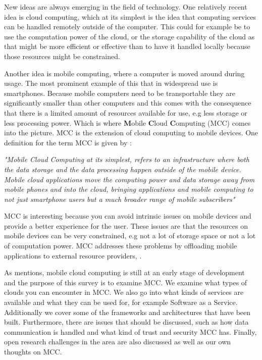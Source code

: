New ideas are always emerging in the field of technology.
One relatively recent idea is cloud computing, which at its simplest is the idea that computing services can be handled remotely outside of the computer. 
This could for example be to use the computation power of the cloud, or the storage capability of the cloud as that might be more efficient or effective than to have it handled locally because those resources might be constrained.

Another idea is mobile computing, where a computer is moved around during usage.
The most prominent example of this that in widespread use is smartphones.
Because mobile computers need to be transportable they are significantly smaller than other computers and this comes with the consequence that there is a limited amount of resources available for use, e.g less storage or less processing power.
Which is where \textbf{M}obile \textbf{C}loud \textbf{C}omputing (MCC) comes into the picture. 
MCC is the extension of cloud computing to mobile devices.
One definition for the term MCC is given by \citet{article:mobilecloudreviewinderkildesecurity}:

\textit{"Mobile Cloud Computing at its simplest, refers to an infrastructure where both the data storage and the data processing happen outside of the mobile device. Mobile cloud applications move the computing power and data storage away from mobile phones and into the cloud, bringing applications and mobile computing to not just smartphone users but a much broader range of mobile subscribers"}

MCC is interesting because you can avoid intrinsic issues on mobile devices and provide a better experience for the user. 
These issues are that the resources on mobile devices can be very constrained, e.g not a lot of storage space or not a lot of computation power.
MCC addresses these problems by offloading mobile applications to external resource providers, \citet{fernando2013mobile}.

As \citet{6215350} mentions, mobile cloud computing is still at an early stage of development and the purpose of this survey is to examine MCC. 
We examine what types of clouds you can encounter in MCC.
We also go into what kinds of services are available and what they can be used for, for example Software as a Service.
Additionally we cover some of the frameworks and architectures that have been built. 
Furthermore, there are issues that should be discussed, such as how data communication is handled and what kind of trust and security MCC has. 
Finally, open research challenges in the area are also discussed as well as our own thoughts on MCC. 